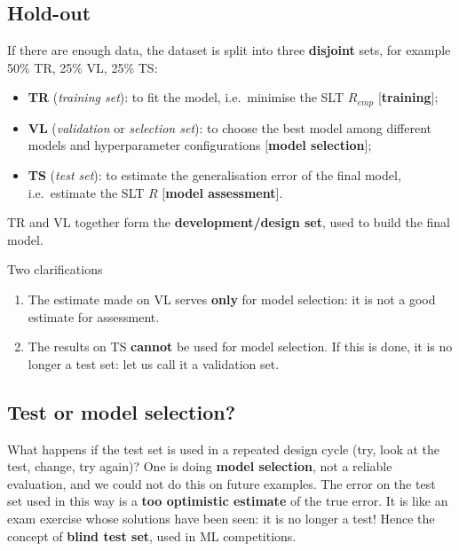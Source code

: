 \subsection{Hold-out}\label{hold-out}

If there are enough data, the dataset is split into three
\textbf{disjoint} sets, for example 50\% TR, 25\% VL, 25\% TS:

\begin{itemize}
\tightlist
\item
  \textbf{TR} (\emph{training set}): to fit the model, i.e.\ minimise
  the SLT \(R_{emp}\) {[}\textbf{training}{]};
\item
  \textbf{VL} (\emph{validation} or \emph{selection set}): to choose
  the best model among different models and hyperparameter
  configurations {[}\textbf{model selection}{]};
\item
  \textbf{TS} (\emph{test set}): to estimate the generalisation error
  of the final model, i.e.\ estimate the SLT \(R\) {[}\textbf{model
  assessment}{]}.
\end{itemize}

TR and VL together form the \textbf{development/design set}, used to
build the final model.

\begin{boxnote}{Two clarifications}

\begin{enumerate}
\def\labelenumi{\arabic{enumi}.}
\tightlist
\item
  The estimate made on VL serves \textbf{only} for model selection: it
  is not a good estimate for assessment.
\item
  The results on TS \textbf{cannot} be used for model selection. If
  this is done, it is no longer a test set: let us call it a validation
  set.
\end{enumerate}

\end{boxnote}

\subsection{Test or model selection?}\label{test-o-model-selection}

What happens if the test set is used in a repeated design cycle (try,
look at the test, change, try again)? One is doing \textbf{model
selection}, not a reliable evaluation, and we could not do this on
future examples. The error on the test set used in this way is a
\textbf{too optimistic estimate} of the true error. It is like an exam
exercise whose solutions have been seen: it is no longer a test! Hence
the concept of \textbf{blind test set}, used in ML competitions.

